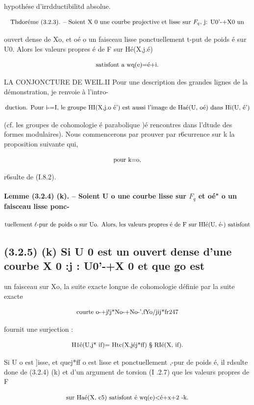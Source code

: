 \documentclass[11pt]{article}
\theoremstyle{remark}
\begin{document}
hypothése d'irrdductibilitd absolue.

\[\text{\small Thdoréme (3.2.3). -- Soient X 0 une courbe projective et lisse sur \(F_q\), j: U0'-+X0 un}\]

ouvert dense de Xo, et oé o un faisceau lisse ponctuellement t-put de poids é sur U0. Alors les valeurs propres é de F sur Hé(X,j.é)

\[\text{\small satisfont a wq(e)=é+i.}\]

LA CONJONCTURE DE WEIL.II Pour une description des grandes lignes de la démonstration, je renvoie à l'intro-

\[\text{\small duction. Pour i-=I, le groupe HI(X,j.o é') est aussi l'image de Haé(U, oé) dans Hi(U, é')}\]

(cf. les groupes de cohomologie é parabolique )é rencontres dans l'dtude des formes modulaires). Nous commencerons par prouver par r6currence sur k la proposition suivante qui,

\[\text{\small pour k=o,}\]

r6sulte de (I.8.2).

\paragraph{Lemme (3.2.4) (k). -- Soient U o une courbe lisse sur \(F_q\) et oé" o un faisceau lisse ponc-}

\[\text{\small tuellement \(\ell\)-pur de poids o sur Uo. Alors, les valeurs propres é de F sur HIé(U, é-) satisfont}\]

\subsection*{(3.2.5) (k) Si U 0 est un ouvert dense d'une courbe X 0 :j : U0'-+X 0 et que go est}

un faisceau sur Xo, la suite exacte longue de cohomologie définie par la suite exacte

\[\text{\small courte o-+j!j*No-+No-',fYo/jij*fr247}\]

fournit une surjection :

\[\text{\small H1é(U,j* if)= Htc(X,jéj*ff) § RIé(X, if).}\]

Si U o est ]isse, et quej*ff o est lisse et ponctuellement ,-pur de poids é, il rdsulte done de (3.2.4) (k) et d'un argument de torsion (I .2.7) que les valeurs propres de F

\[\text{\small sur Haé(X, c5) satisfont é wq(e)<é+x+2 -k.}\]
\end{document}
